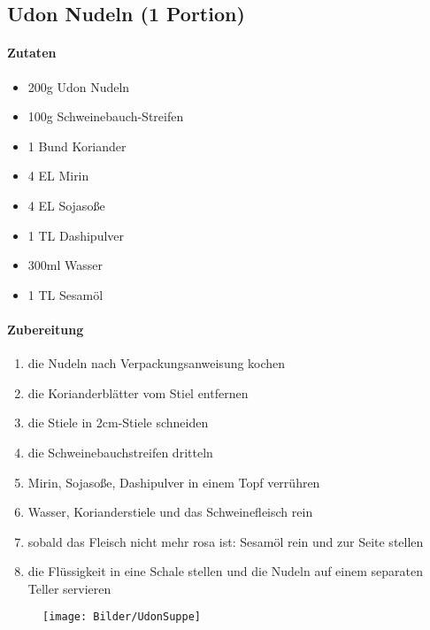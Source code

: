 \newpage
\subsection{Udon Nudeln (1 Portion)}
\paragraph{Zutaten}
\begin{itemize}[noitemsep]
	\item 200g Udon Nudeln
	\item 100g Schweinebauch-Streifen
	\item 1 Bund Koriander
	\item 4 EL Mirin
	\item 4 EL Sojasoße
	\item 1 TL Dashipulver
	\item 300ml Wasser
	\item 1 TL Sesamöl 
\end{itemize}
\paragraph{Zubereitung}
\begin{enumerate}[noitemsep]
	\item die Nudeln nach Verpackungsanweisung kochen
	\item die Korianderblätter vom Stiel entfernen
	\item die Stiele in 2cm-Stiele schneiden
	\item die Schweinebauchstreifen dritteln
	\item Mirin, Sojasoße, Dashipulver in einem Topf verrühren
	\item Wasser, Korianderstiele und das Schweinefleisch rein
	\item sobald das Fleisch nicht mehr rosa ist: Sesamöl rein und zur Seite stellen 
	\item die Flüssigkeit in eine Schale stellen und die Nudeln auf einem separaten Teller servieren
\end{enumerate}
\begin{figure}[h]
\centering
\texttt{[image: Bilder/UdonSuppe]}
\end{figure}